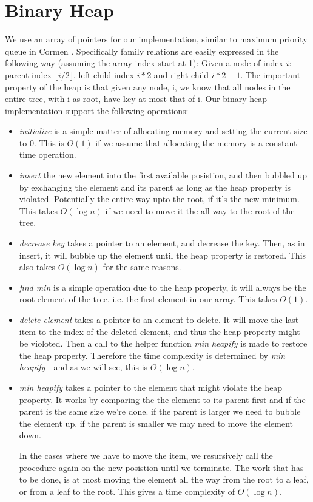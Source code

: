 \section*{Binary Heap}
We use an array of pointers for our implementation, similar to maximum priority queue in Cormen \cite{cormen}. Specifically family relations are easily expressed in the following way (assuming the array index start at 1): Given a node of index $i$: parent index $\lfloor i/2 \rfloor$, left child index $i*2$ and right child $i*2+1$. The important property of the heap is that given any node, i, we know that all nodes in the entire tree, with i as root, have key at most that of i. Our binary heap implementation support the following operations:
\begin{itemize}
 \item{\em{initialize}} is a simple matter of allocating memory and setting the current size to $0$. This is $O(1)$ if we assume that allocating the memory is a constant time operation.
 \item{\em{insert}} the new element into the first available posistion, and then bubbled up by exchanging the element and its parent as long as the heap property is violated. Potentially the entire way upto the root, if it's the new minimum. This takes $O(\log n)$ if we need to move it the all way to the root of the tree.
 \item{\em{decrease key}} takes a pointer to an element, and decrease the key. Then, as in insert, it will bubble up the element until the heap property is restored. This also takes $O(\log n)$ for the same reasons.
 \item{\em{find min}} is a simple operation due to the heap property, it will always be the root element of the tree, i.e. the first element in our array. This takes $O(1)$.
 \item{\em{delete element}} takes a pointer to an element to delete. It will move the last item to the index of the deleted element, and thus the heap property might be violoted. Then a call to the helper function \textit{min heapify} is made to restore the heap property. Therefore the time complexity is determined by \textit{min heapify} - and as we will see, this is $O(\log n)$.
 \item{\em{min heapify}} takes a pointer to the element that might violate the heap property. It works by comparing the the element to its parent first and
   \subitem if the parent is the same size we're done.
   \subitem if the parent is larger we need to bubble the element up.
   \subitem if the parent is smaller we may need to move the element down.

 In the cases where we have to move the item, we resursively call the procedure again on the new posistion until we terminate. The work that has to be done, is at most moving the element all the way from the root to a leaf, or from a leaf to the root. This gives a time complexity of $O(\log n)$.
\end{itemize}